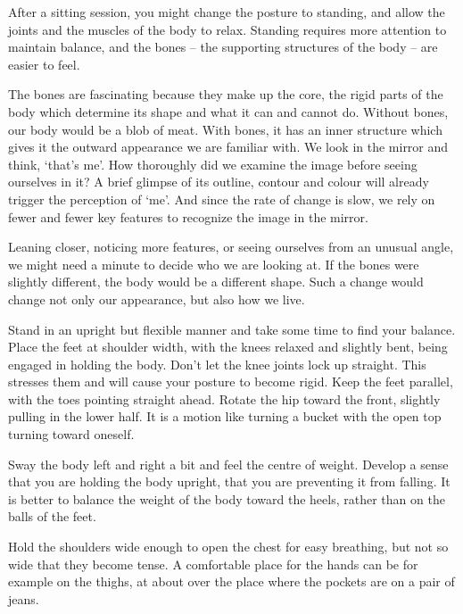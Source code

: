 After a sitting session, you might change the posture to standing, and
allow the joints and the muscles of the body to relax. Standing requires
more attention to maintain balance, and the bones -- the supporting
structures of the body -- are easier to feel.

The bones are fascinating because they make up the core, the rigid parts
of the body which determine its shape and what it can and cannot do.
Without bones, our body would be a blob of meat. With bones, it has an
inner structure which gives it the outward appearance we are familiar
with. We look in the mirror and think, `that's me'. How thoroughly did
we examine the image before seeing ourselves in it? A brief glimpse of
its outline, contour and colour will already trigger the perception of
`me'. And since the rate of change is slow, we rely on fewer and fewer
key features to recognize the image in the mirror.

\clearpage
\thispagestyle{empty}\mbox{}
\clearpage

Leaning closer, noticing more features, or seeing ourselves from an
unusual angle, we might need a minute to decide who we are looking at.
If the bones were slightly different, the body would be a different
shape. Such a change would change not only our appearance, but also how
we live.


Stand in an upright but flexible manner and take some time to find your
balance. Place the feet at shoulder width, with the knees relaxed and
slightly bent, being engaged in holding the body. Don't let the knee
joints lock up straight. This stresses them and will cause your posture
to become rigid. Keep the feet parallel, with the toes pointing straight
ahead. Rotate the hip toward the front, slightly pulling in the lower
half. It is a motion like turning a bucket with the open top turning
toward oneself.

Sway the body left and right a bit and feel the centre of weight.
Develop a sense that you are holding the body upright, that you are
preventing it from falling. It is better to balance the weight of the
body toward the heels, rather than on the balls of the feet.

Hold the shoulders wide enough to open the chest for easy breathing, but
not so wide that they become tense. A comfortable place for the hands
can be for example on the thighs, at about over the place where the
pockets are on a pair of jeans.


